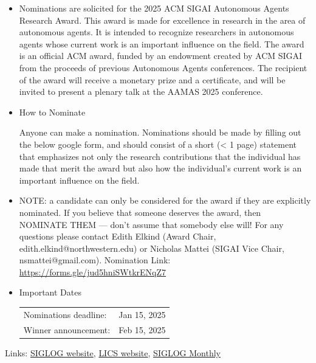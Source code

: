 \documentclass[prodmode,acmtecs]{acmsmall} %
\begin{document}
\begin{itemize}\item  Nominations are solicited for the 2025 ACM SIGAI Autonomous Agents Research Award. This award is made for excellence in research in the area of autonomous agents. It is intended to recognize researchers in autonomous agents whose current work is an important influence on the field. The award is an official ACM award, funded by an endowment created by ACM SIGAI from the proceeds of previous Autonomous Agents conferences. The recipient of the award will receive a monetary prize and a certificate, and will be invited to present a plenary talk at the AAMAS 2025 conference. 
 
\item  How to Nominate 
 
  Anyone can make a nomination. Nominations should be made by filling out the below google form, and should consist of a short (< 1 page) statement that emphasizes not only the research contributions that the individual has made that merit the award but also how the individual’s current work is an important influence on the field. 
 
\item  NOTE: a candidate can only be considered for the award if they are explicitly nominated. If you believe that someone deserves the award, then NOMINATE THEM — don’t assume that somebody else will!  For any questions please contact Edith Elkind (Award Chair, edith.elkind@northwestern.edu) or Nicholas Mattei (SIGAI Vice Chair, nsmattei@gmail.com). Nomination Link: \href{https://forms.gle/jud5hniSWtkrENqZ7}{https://forms.gle/jud5hniSWtkrENqZ7} 
 
\item  Important Dates 
 
\begin{tabulary}{\linewidth}{LL}Nominations deadline:  & Jan 15, 2025 \\
Winner announcement:  & Feb 15, 2025 \\
\end{tabulary}
 
\end{itemize}


\bigskip Links: \href{http://siglog.org/}{SIGLOG website}, \href{https://lics.siglog.org}{LICS website}, \href{https://lics.siglog.org/newsletters/}{SIGLOG Monthly}
\end{document}
